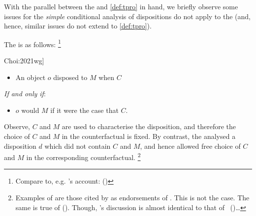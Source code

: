 \begin{note}
  With the parallel between the \dBCAa{} and \autoref{def:tpro} in hand, we briefly observe some issues for the \emph{simple} conditional analysis of dispositions do not apply to the \dBCAa{} (and, hence, similar issues do not extend to \autoref{def:tpro}).
  

  The \dSCA{} is as follows:%
  \footnote{
    Compare to, e.g. \citeauthor{Lewis:1997wg}'s account:
    (\citeyear[143]{Lewis:1997wg})
  }

  \begin{sketch}[The \dSCA{} --- \dSCAa{}, cf.\ \cite[\S1.2]{Choi:2021wg}]%
    \label{sketch:dSCA}
    \vspace{-\baselineskip}
    \begin{itemize}
    \item
      An object \(o\) disposed to \(M\) when \(C\)
    \end{itemize}
    \emph{If and only if}:
    \begin{itemize}
    \item
      \(o\) would \(M\) if it were the case that \(C\).
    \end{itemize}
    \vspace{-\baselineskip}
  \end{sketch}

  \noindent%
  Observe, \(C\) and \(M\) are used to characterise the disposition, and therefore the choice of \(C\) and \(M\) in the counterfactual is fixed.
  By contrast, the \dBCAa{} analysed a disposition \(d\) which did not contain \(C\) and \(M\), and hence allowed free choice of \(C\) and \(M\) in the corresponding counterfactual.%
    \footnote{
    Examples of  are those cited by \citeauthor{Choi:2021wg} as endorsements of .
    This is not the case.
    The same is true of \citeauthor{Manley:2008aa} (\citeyear[60]{Manley:2008aa}).
    Though, \citeauthor{Manley:2008aa}'s discussion is almost identical to that of \citeauthor{Fara:2006aa}~(\citeyear[\S2.1]{Fara:2006aa})\dots

}
\end{note}

